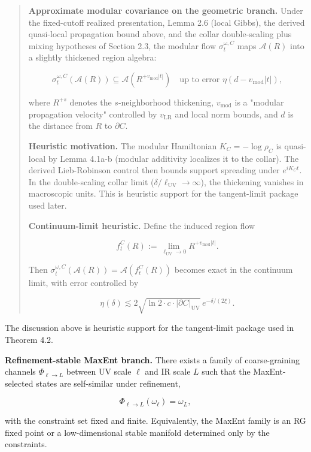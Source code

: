 \begin{quote}
\textbf{Approximate modular covariance on the geometric branch.} Under the fixed-cutoff realized presentation, Lemma 2.6 (local Gibbs), the derived quasi-local propagation bound above, and the collar double-scaling plus mixing hypotheses of Section 2.3, the modular flow \(\sigma_t^{\omega,C}\) maps \(\mathcal{A}(R)\) into a slightly thickened region algebra:

\[
\sigma_t^{\omega,C}(\mathcal{A}(R)) \subseteq \mathcal{A}(R^{+v_{\mathrm{mod}}|t|})
\quad \text{up to error } \eta(d - v_{\mathrm{mod}}|t|),
\]

where \(R^{+s}\) denotes the \(s\)-neighborhood thickening, \(v_{\mathrm{mod}}\) is a "modular propagation velocity" controlled by \(v_{\mathrm{LR}}\) and local norm bounds, and \(d\) is the distance from \(R\) to \(\partial C\).

\textbf{Heuristic motivation.} The modular Hamiltonian \(K_C = -\log \rho_C\) is quasi-local by Lemma 4.1a-b (modular additivity localizes it to the collar). The derived Lieb-Robinson control then bounds support spreading under \(e^{iK_C t}\). In the double-scaling collar limit (\(\delta/\ell_{\mathrm{UV}} \to \infty\)), the thickening vanishes in macroscopic units. This is heuristic support for the tangent-limit package used later.

\textbf{Continuum-limit heuristic.} Define the induced region flow

\[
f_t^C(R) := \lim_{\ell_{\mathrm{UV}} \to 0} R^{+v_{\mathrm{mod}}|t|}.
\]

Then \(\sigma_t^{\omega,C}(\mathcal{A}(R)) = \mathcal{A}(f_t^C(R))\) becomes exact in the continuum limit, with error controlled by

\[
\eta(\delta) \lesssim 2\sqrt{\ln 2 \cdot c \cdot |\partial C|_{\mathrm{UV}}} \, e^{-\delta/(2\xi)}.
\]
\end{quote}

The discussion above is heuristic support for the tangent-limit package used in Theorem 4.2.

\textbf{Refinement-stable MaxEnt branch.} There exists a family of coarse-graining channels \(\Phi_{\ell\to L}\) between UV scale \(\ell\) and IR scale \(L\) such that the MaxEnt-selected states are self-similar under refinement,

\[
\Phi_{\ell\to L}(\omega_{\ell}) = \omega_{L},
\]

with the constraint set fixed and finite. Equivalently, the MaxEnt family is an RG fixed point or a low-dimensional stable manifold determined only by the constraints.

